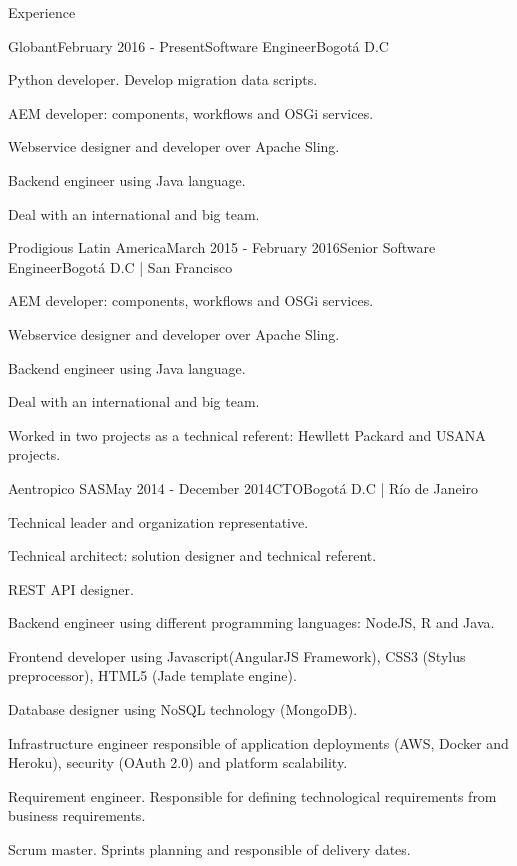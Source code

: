 \documentclass[spanish]{resume}
\begin{document}
\begin{rSection}{Experience}


\begin{rSubsection}{Globant}{February 2016 - Present}{Software Engineer}{Bogot\'a D.C}
\item Python developer. Develop migration data scripts.
\item AEM developer: components, workflows and OSGi services.
\item Webservice designer and developer over Apache Sling.  
\item Backend engineer using Java language.
\item Deal with an international and big team.
\end{rSubsection}


\begin{rSubsection}{Prodigious Latin America}{March 2015 - February 2016}{Senior Software Engineer}{Bogot\'a D.C | San Francisco}
\item AEM developer: components, workflows and OSGi services.
\item Webservice designer and developer over Apache Sling.  
\item Backend engineer using Java language.
\item Deal with an international and big team.
\item Worked in two projects as a technical referent: Hewllett Packard and USANA projects.
\end{rSubsection}


\begin{rSubsection}{Aentropico SAS}{May 2014 - December 2014}{CTO}{Bogot\'a D.C | R\'io de Janeiro}
\item Technical leader and organization representative.
\item Technical architect: solution designer and technical referent.
\item REST API designer.
\item Backend engineer using different programming languages: NodeJS, R and Java.
\item Frontend developer using Javascript(AngularJS Framework), CSS3 (Stylus preprocessor), HTML5 (Jade template engine).
\item Database designer using NoSQL technology (MongoDB).
\item Infrastructure engineer responsible of application deployments (AWS, Docker and Heroku), security (OAuth 2.0) and platform scalability.
\item Requirement engineer. Responsible for defining technological requirements from business requirements.
\item Scrum master. Sprints planning and responsible of delivery dates.
\end{rSubsection}


\end{rSection}
\end{document}
